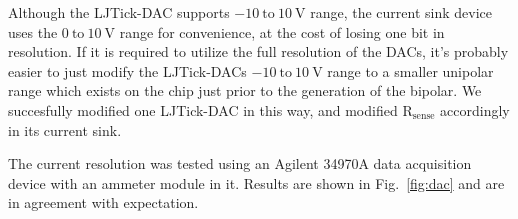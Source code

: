 
Although the LJTick-DAC supports $\mathrm{-10~to~10~V}$ range, the current sink device uses the $\mathrm{0~to~10~V}$ range for convenience, at the cost of losing one bit in resolution. If it is required to utilize the full resolution of the DACs,  it's probably easier to just modify the LJTick-DACs $\mathrm{-10~to~10~V}$ range to a smaller unipolar range which exists on the chip just prior to the generation of the bipolar. We succesfully modified one LJTick-DAC in this way, and modified $\mathrm{R_{sense}}$ accordingly in its current sink. 


The current resolution was tested using an Agilent 34970A data acquisition device with an ammeter module in it. Results are shown in Fig.~\ref{fig:dac} and are in agreement with expectation.


